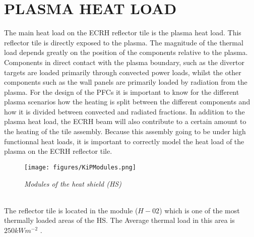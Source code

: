 \section{PLASMA HEAT LOAD}
\normalsize{The main heat load on the \acrshort{ECRH} reflector tile is the plasma heat load. This reflector tile is directly exposed to the plasma. The magnitude of the thermal load depends greatly on the position of the components relative to the plasma. Components in direct contact with the plasma boundary, such as the divertor targets are loaded primarily through convected power loads, whilst the other components such as the wall panels are primarily loaded by radiation from the plasma. For the design of the \acrshort{PFCs} it is important to know for the different plasma scenarios how the heating is split between the different components and how it is divided between convected and radiated fractions. In addition to the plasma heat load, the \acrshort{ECRH} beam will also contribute to a certain amount to the heating of the tile assembly. Because this assembly going to be under high functionnal heat loads, it is important to correctly model the heat load of the plasma on the \acrshort{ECRH} reflector tile.}
\\
\begin{figure}[h!]
    \label{fig_4_1_0} 
    \centering
    \texttt{[image: figures/KiPModules.png]}
    \caption{\it Modules of the heat shield (\acrshort{HS})}
\end{figure}
\\
\normalsize{\indent The reflector tile is located in the module ($H-02$) which is one of the most thermally loaded areas of the \acrshort{HS}. The Average thermal load in this area is $250 \unit{kWm^{-2}}$ \cite{Van_Eeten_2022}.}
\newpage